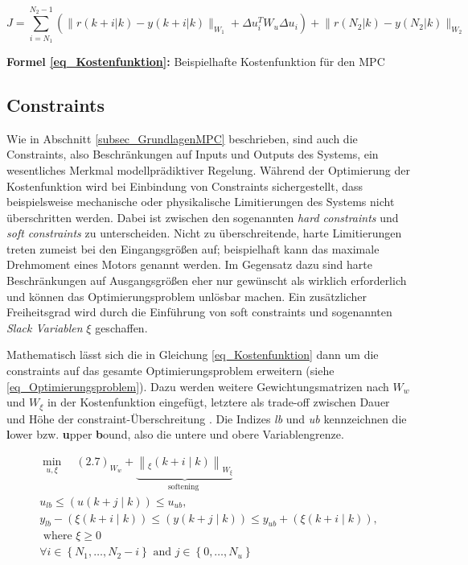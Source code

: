 \begin{equation} \label{eq_Kostenfunktion}
    J = \sum_{i=N_1}^{N_2-1}\left(\lVert r(k+i\rvert k)-y(k+i\rvert k)\rVert_{W_1} + \Delta u_i^T W_u \Delta u_i\right) + \lVert r(N_2\rvert k)-y(N_2\rvert k)\rVert_{W_2}
\end{equation}
\centerline{\small{\textsf{\textbf{Formel \ref{eq_Kostenfunktion}:}} Beispielhafte Kostenfunktion für den MPC}}


\subsection{Constraints} \label{subsec_Constraints}
Wie in Abschnitt \ref{subsec_GrundlagenMPC} beschrieben, sind auch die Constraints, also Beschränkungen auf Inputs und Outputs des Systems, ein wesentliches Merkmal modellprädiktiver Regelung.
Während der Optimierung der Kostenfunktion wird bei Einbindung von Constraints sichergestellt, dass beispielsweise mechanische oder physikalische Limitierungen des Systems nicht überschritten werden.
Dabei ist zwischen den sogenannten \textit{hard constraints} und \textit{soft constraints} zu unterscheiden.
Nicht zu überschreitende, harte Limitierungen treten zumeist bei den Eingangsgrößen auf; beispielhaft kann das maximale Drehmoment eines Motors genannt werden.
Im Gegensatz dazu sind harte Beschränkungen auf Ausgangsgrößen eher nur gewünscht als wirklich erforderlich und können das Optimierungsproblem unlösbar machen.
Ein zusätzlicher Freiheitsgrad wird durch die Einführung von soft constraints und sogenannten \textit{Slack Variablen} $\xi$ geschaffen. \cite[S.4]{Schwenzer}

Mathematisch lässt sich die in Gleichung \ref{eq_Kostenfunktion} dann um die constraints auf das gesamte Optimierungsproblem erweitern (siehe \ref{eq_Optimierungsproblem}).
Dazu werden weitere Gewichtungsmatrizen nach \cite[S.4]{Schwenzer}$W_w$ und $W_\xi$ in der Kostenfunktion eingefügt, letztere als trade-off zwischen Dauer und Höhe der constraint-Überschreitung \cite{Rawlings}.
Die Indizes \textit{lb} und \textit{ub} kennzeichnen die \textbf{l}ower bzw. \textbf{u}pper \textbf{b}ound, also die untere und obere Variablengrenze.

\begin{equation} \label{eq_Optimierungsproblem}
\begin{gathered}
    \min_{u, \xi} \quad (2.7)_{W_w}+\underbrace{\left\|_{\xi}(k+i \mid k)\right\|_{W_{\xi}}}_{\text {softening }} \qquad\\
    u_{l b} \leq(u(k+j \mid k)) \leq u_{u b}, \\
    y_{l b}-(\xi(k+i \mid k)) \leq(y(k+j \mid k)) \leq y_{u b}+(\xi(k+i \mid k)), \\
    \text { where } \xi \geq 0 \\
    \forall i \in\left\{N_1, \ldots, N_2-i\right\} \text { and } j \in\left\{0, \ldots, N_u\right\}
\end{gathered}
\end{equation}

